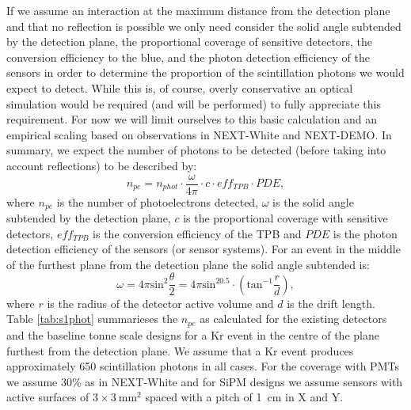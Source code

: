 \documentclass[11pt,a4paper]{article}
\begin{document}
If we assume an interaction at the maximum distance from the detection plane and that no reflection is possible we only need consider the solid angle subtended by the detection plane, the proportional coverage of sensitive detectors, the conversion efficiency to the blue, and the photon detection efficiency of the sensors in order to determine the proportion of the scintillation photons we would expect to detect. While this is, of course, overly conservative an optical simulation would be required (and will be performed) to fully appreciate this requirement. For now we will limit ourselves to this basic calculation and an empirical scaling based on observations in NEXT-White and NEXT-DEMO. In summary, we expect the number of photons to be detected (before taking into account reflections) to be described by:
\begin{equation}
  \label{eq:s1npe}
  n_{pe} = n_{phot} \cdot \frac{\omega}{4\pi} \cdot c \cdot eff_{TPB} \cdot PDE,
\end{equation}
where $n_{pe}$ is the number of photoelectrons detected, $\omega$ is the solid angle subtended by the detection plane, $c$ is the proportional coverage with sensitive detectors, $eff_{TPB}$ is the conversion efficiency of the TPB and $PDE$ is the photon detection efficiency of the sensors (or sensor systems). For an event in the middle of the furthest plane from the detection plane the solid angle subtended is:
\begin{equation}
  \label{eq:s1solidangle}
  \omega = 4\pi \mbox{sin}^2\frac{\theta}{2} = 4\pi \mbox{sin}^20.5\cdot(\mbox{tan}^{-1}\frac{r}{d}),
\end{equation}
where $r$ is the radius of the detector active volume and $d$ is the drift length. Table \ref{tab:s1phot} summarieses the $n_{pe}$ as calculated for the existing detectors and the baseline tonne scale designs for a Kr event in the centre of the plane furthest from the detection plane. We assume that a Kr event produces approximately 650 scintillation photons in all cases. For the coverage with PMTs we assume 30\% as in NEXT-White and for SiPM designs we assume sensors with active surfaces of $3\times 3~\mbox{mm}^2$ spaced with a pitch of 1~cm in X and Y.
\end{document}
